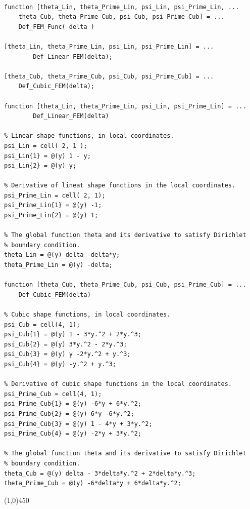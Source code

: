 \begin{lstlisting}[caption = {Linear and Cubic Shape-Functions}, label = lst:Def_FEM_Func]

function [theta_Lin, theta_Prime_Lin, psi_Lin, psi_Prime_Lin, ...
    theta_Cub, theta_Prime_Cub, psi_Cub, psi_Prime_Cub] = ...
    Def_FEM_Func( delta )

[theta_Lin, theta_Prime_Lin, psi_Lin, psi_Prime_Lin] = ...
        Def_Linear_FEM(delta);

[theta_Cub, theta_Prime_Cub, psi_Cub, psi_Prime_Cub] = ...
    Def_Cubic_FEM(delta);

function [theta_Lin, theta_Prime_Lin, psi_Lin, psi_Prime_Lin] = ...
        Def_Linear_FEM(delta)

% Linear shape functions, in local coordinates.
psi_Lin = cell( 2, 1 );
psi_Lin{1} = @(y) 1 - y;
psi_Lin{2} = @(y) y;

% Derivative of lineat shape functions in the local coordinates.
psi_Prime_Lin = cell( 2, 1);
psi_Prime_Lin{1} = @(y) -1;
psi_Prime_Lin{2} = @(y) 1;

% The global function theta and its derivative to satisfy Dirichlet
% boundary condition.
theta_Lin = @(y) delta -delta*y;
theta_Prime_Lin = @(y) -delta;

function [theta_Cub, theta_Prime_Cub, psi_Cub, psi_Prime_Cub] = ...
    Def_Cubic_FEM(delta)

% Cubic shape functions, in local coordinates.
psi_Cub = cell(4, 1);
psi_Cub{1} = @(y) 1 - 3*y.^2 + 2*y.^3;
psi_Cub{2} = @(y) 3*y.^2 - 2*y.^3;
psi_Cub{3} = @(y) y -2*y.^2 + y.^3;
psi_Cub{4} = @(y) -y.^2 + y.^3;

% Derivative of cubic shape functions in the local coordinates.
psi_Prime_Cub = cell(4, 1);
psi_Prime_Cub{1} = @(y) -6*y + 6*y.^2;
psi_Prime_Cub{2} = @(y) 6*y -6*y.^2;
psi_Prime_Cub{3} = @(y) 1 - 4*y + 3*y.^2;
psi_Prime_Cub{4} = @(y) -2*y + 3*y.^2;

% The global function theta and its derivative to satisfy Dirichlet
% boundary condition.
theta_Cub = @(y) delta - 3*delta*y.^2 + 2*delta*y.^3;
theta_Prime_Cub = @(y) -6*delta*y + 6*delta*y.^2;

\end{lstlisting}
\line(1,0){450}
\vspace{5 mm}



